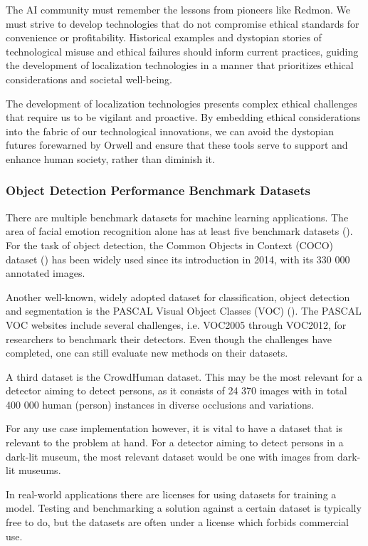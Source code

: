 The AI community must remember the lessons from pioneers like Redmon. We must strive to develop technologies that do not compromise ethical standards for convenience or profitability. Historical examples and dystopian stories of technological misuse and ethical failures should inform current practices, guiding the development of localization technologies in a manner that prioritizes ethical considerations and societal well-being.

The development of localization technologies presents complex ethical challenges that require us to be vigilant and proactive. By embedding ethical considerations into the fabric of our technological innovations, we can avoid the dystopian futures forewarned by Orwell and ensure that these tools serve to support and enhance human society, rather than diminish it.

\subsubsection{Object Detection Performance Benchmark Datasets}
\label{sec:performance_benchmark}
There are multiple benchmark datasets for machine learning applications. The area of facial emotion recognition alone has at least five benchmark datasets (\cite{sa2022facialemotions}). For the task of object detection, the Common Objects in Context (COCO) dataset (\cite{li2014cocodataset}) has been widely used since its introduction in 2014, with its 330 000 annotated images.

Another well-known, widely adopted dataset for classification, object detection and segmentation is the PASCAL Visual Object Classes (VOC) (\cite{ev2010pascaldataset}). The PASCAL VOC websites include several challenges, i.e. VOC2005 through VOC2012, for researchers to benchmark their detectors. Even though the challenges have completed, one can still evaluate new methods on their datasets.

A third dataset is the CrowdHuman dataset. This may be the most relevant for a detector aiming to detect persons, as it consists of 24 370 images with in total 400 000 human (person) instances in diverse occlusions and variations.

For any use case implementation however, it is vital to have a dataset that is relevant to the problem at hand. For a detector aiming to detect persons in a dark-lit museum, the most relevant dataset would be one with images from dark-lit museums.

In real-world applications there are licenses for using datasets for training a model. Testing and benchmarking a solution against a certain dataset is typically free to do, but the datasets are often under a license which forbids commercial use.


